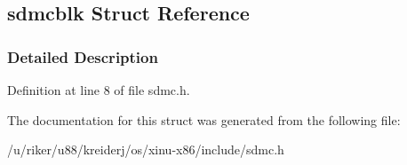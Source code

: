 \hypertarget{structsdmcblk}{}\subsection{sdmcblk Struct Reference}
\label{structsdmcblk}


\subsubsection{Detailed Description}


Definition at line 8 of file sdmc.\+h.



The documentation for this struct was generated from the following file\+:\begin{DoxyCompactItemize}
\item 
/u/riker/u88/kreiderj/os/xinu-\/x86/include/sdmc.\+h\end{DoxyCompactItemize}
